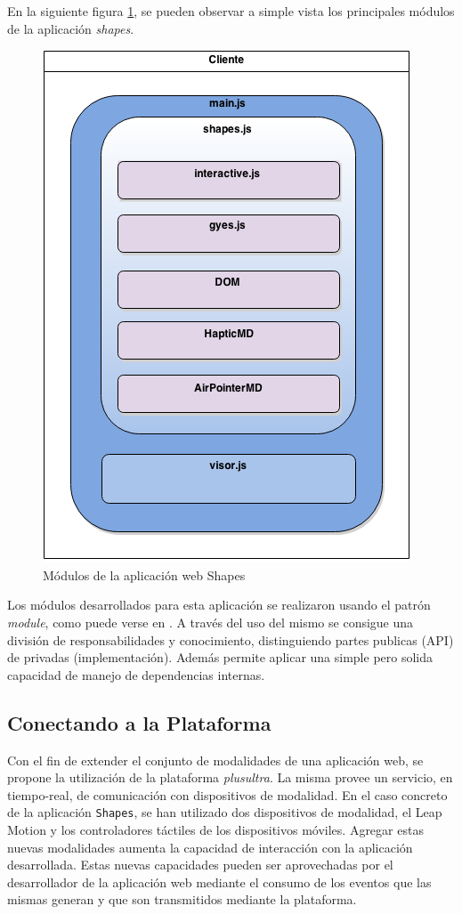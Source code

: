 En la siguiente figura \ref{fig:demo_shapes_app}, se pueden observar a simple vista los principales módulos de la aplicación \emph{shapes}.
\begin{center}
  \begin{figure}[h]
    \includegraphics[scale=0.7]{gfx/shapes_app_demo}
    \caption{Módulos de la aplicación web Shapes}
    \label{fig:demo_shapes_app}
  \end{figure}
\end{center}


Los módulos desarrollados para esta aplicación se realizaron usando el patrón \emph{module}, como puede verse en \citet{demo:module_pattern}. A través del uso del mismo se consigue una división de responsabilidades y conocimiento, distinguiendo partes publicas (API) de privadas (implementación). Además permite aplicar una simple pero solida capacidad de manejo de dependencias internas. 

\subsection{Conectando a la Plataforma}
Con el fin de extender el conjunto de modalidades de una aplicación web, se propone la utilización de la plataforma \emph{plusultra}. La misma provee un servicio, en tiempo-real, de comunicación con dispositivos de modalidad. En el caso concreto de la aplicación \texttt{Shapes}, se han utilizado dos dispositivos de modalidad, el Leap Motion y los controladores táctiles de los dispositivos móviles. Agregar estas nuevas modalidades aumenta la capacidad de interacción con la aplicación desarrollada. Estas nuevas capacidades pueden ser aprovechadas por el desarrollador de la aplicación web mediante el consumo de los eventos que las mismas generan y que son transmitidos mediante la plataforma. 

